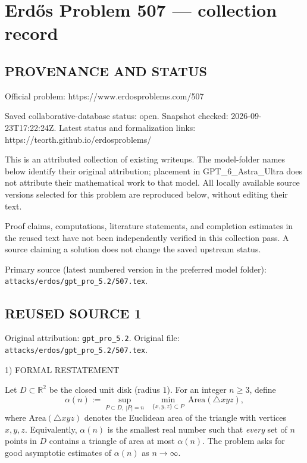 \section*{Erd\H{o}s Problem 507 --- collection record}

\subsection*{PROVENANCE AND STATUS}
Official problem: https://www.erdosproblems.com/507

Saved collaborative-database status: open.
Snapshot checked: 2026-09-23T17:22:24Z.
Latest status and formalization links: https://teorth.github.io/erdosproblems/

This is an attributed collection of existing writeups. The model-folder names below identify their original attribution; placement in GPT\_6\_Astra\_Ultra does not attribute their mathematical work to that model. All locally available source versions selected for this problem are reproduced below, without editing their text.

Proof claims, computations, literature statements, and completion estimates in the reused text have not been independently verified in this collection pass. A source claiming a solution does not change the saved upstream status.

Primary source (latest numbered version in the preferred model folder): \texttt{attacks/erdos/gpt\_pro\_5.2/507.tex}.

\subsection*{REUSED SOURCE 1}
Original attribution: \texttt{gpt\_pro\_5.2}.
Original file: \texttt{attacks/erdos/gpt\_pro\_5.2/507.tex}.


1) FORMAL RESTATEMENT

Let $D\subset\mathbb R^2$ be the closed unit disk (radius $1$).
For an integer $n\ge 3$, define
\[
\alpha(n):=\sup_{P\subset D,\ |P|=n}\ \ \min_{\{x,y,z\}\subset P}\ \mathrm{Area}(\triangle xyz),
\]
where $\mathrm{Area}(\triangle xyz)$ denotes the Euclidean area of the triangle with vertices $x,y,z$.
Equivalently, $\alpha(n)$ is the smallest real number such that \emph{every} set of $n$ points in $D$ contains a triangle of area at most $\alpha(n)$.
The problem asks for good asymptotic estimates of $\alpha(n)$ as $n\to\infty$.

